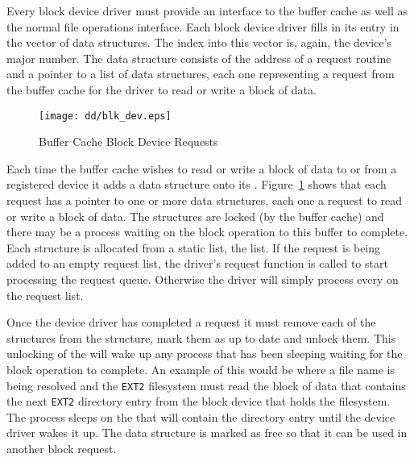 Every block device driver must provide an interface to the buffer cache 
as well as the normal file operations interface.
Each block device driver fills in its entry in the 
 vector
of  data structures.
The index into this vector is, again, the device's major number.
The  data structure consists of the address of a 
request routine and a pointer to a list of  data structures,
each one representing a request from the buffer cache for the driver to
read or write a block of data.

\begin{figure}
\begin{center}
{\centering \texttt{[image: dd/blk\_dev.eps]} \par}
\end{center}
\caption{Buffer Cache Block Device Requests}
\label{blk-dev-figure}
\end{figure}
Each time the buffer cache wishes to read or write a block of data to or
from a registered device it adds a  data structure onto its
.
Figure~\ref{blk-dev-figure} shows that each request has a pointer to one or more  data structures,
each one a request to read or write a block of data.
The  structures are locked (by the buffer cache) and there 
may be a process  waiting on the block operation to this buffer to complete.
Each  structure is allocated from a static list, the 
list.
If the request is being added to an empty request list, the driver's 
request function is called to start processing the request queue.
Otherwise the driver will simply process every  on the request
list.

Once the device driver has completed a request it must remove each of the
 structures from the  structure, mark them as
up to date and unlock them.
This unlocking of the  will wake up any process that has
been sleeping waiting for the block operation to complete.
An example of this would be where a file name is being resolved and the
\texttt{EXT2} filesystem must read the block of data that contains the
next \texttt{EXT2} directory entry from the block device that holds the 
filesystem.
The process sleeps on the  that will contain the directory
entry until the device driver wakes it up.
The  data structure is marked as free so that it can be used
in another block request.

